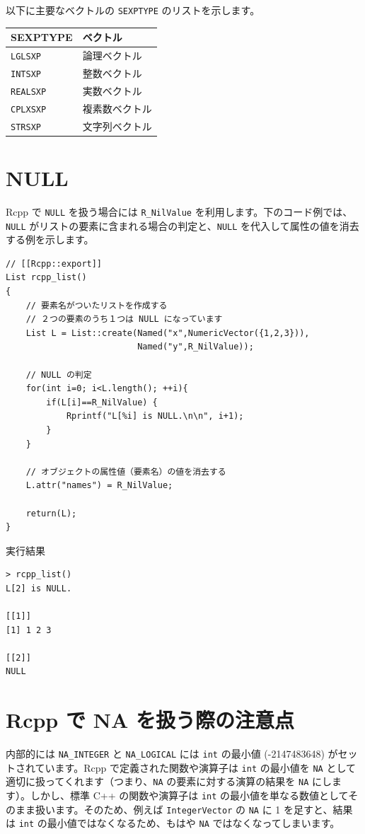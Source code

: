 \documentclass[]{book}
\begin{document}
以下に主要なベクトルの \texttt{SEXPTYPE} のリストを示します。

\begin{longtable}[]{@{}ll@{}}
\toprule
SEXPTYPE & ベクトル\tabularnewline
\midrule
\endhead
\texttt{LGLSXP} & 論理ベクトル\tabularnewline
\texttt{INTSXP} & 整数ベクトル\tabularnewline
\texttt{REALSXP} & 実数ベクトル\tabularnewline
\texttt{CPLXSXP} & 複素数ベクトル\tabularnewline
\texttt{STRSXP} & 文字列ベクトル\tabularnewline
\bottomrule
\end{longtable}

\hypertarget{null}{%
\section{NULL}\label{null}}

Rcpp で \texttt{NULL} を扱う場合には \texttt{R\_NilValue} を利用します。下のコード例では、\texttt{NULL} がリストの要素に含まれる場合の判定と、\texttt{NULL} を代入して属性の値を消去する例を示します。

\begin{verbatim}
// [[Rcpp::export]]
List rcpp_list()
{
    // 要素名がついたリストを作成する
    // ２つの要素のうち１つは NULL になっています
    List L = List::create(Named("x",NumericVector({1,2,3})),
                          Named("y",R_NilValue));

    // NULL の判定
    for(int i=0; i<L.length(); ++i){
        if(L[i]==R_NilValue) {
            Rprintf("L[%i] is NULL.\n\n", i+1);
        }
    }

    // オブジェクトの属性値（要素名）の値を消去する
    L.attr("names") = R_NilValue;

    return(L);
}
\end{verbatim}

実行結果

\begin{verbatim}
> rcpp_list()
L[2] is NULL.

[[1]]
[1] 1 2 3

[[2]]
NULL
\end{verbatim}

\hypertarget{rcpp--na-}{%
\section{Rcpp で NA を扱う際の注意点}\label{rcpp--na-}}

内部的には \texttt{NA\_INTEGER} と \texttt{NA\_LOGICAL} には \texttt{int} の最小値 (-2147483648) がセットされています。Rcpp で定義された関数や演算子は \texttt{int} の最小値を \texttt{NA} として適切に扱ってくれます（つまり、\texttt{NA} の要素に対する演算の結果を \texttt{NA} にします）。しかし、標準 C++ の関数や演算子は \texttt{int} の最小値を単なる数値としてそのまま扱います。そのため、例えば \texttt{IntegerVector} の \texttt{NA} に 1 を足すと、結果は \texttt{int} の最小値ではなくなるため、もはや \texttt{NA} ではなくなってしまいます。
\end{document}
